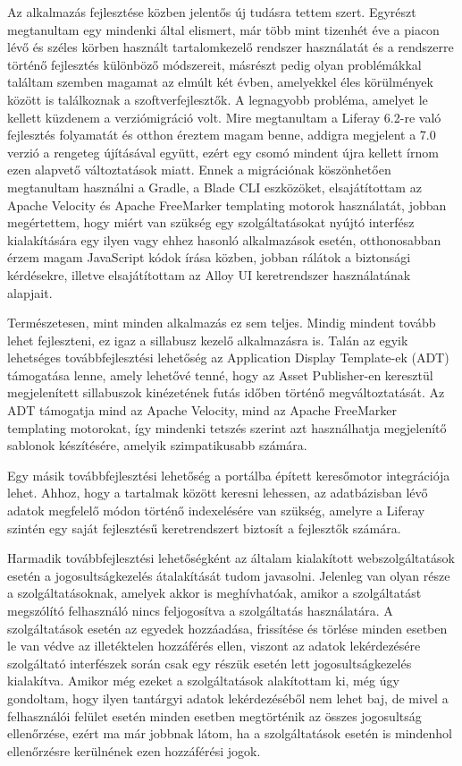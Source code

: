 \documentclass[hidelinks, 12pt, a4paper]{report}
\begin{document}
Az alkalmazás fejlesztése közben jelentős új tudásra tettem szert. Egyrészt megtanultam egy mindenki által elismert, már több mint tizenhét éve a piacon lévő és széles körben használt tartalomkezelő rendszer használatát és a rendszerre történő fejlesztés különböző módszereit, másrészt pedig olyan problémákkal találtam szemben magamat az elmúlt két évben, amelyekkel éles körülmények között is találkoznak a szoftverfejlesztők. A legnagyobb probléma, amelyet le kellett küzdenem a verziómigráció volt. Mire megtanultam a Liferay 6.2-re való fejlesztés folyamatát és otthon éreztem magam benne, addigra megjelent a 7.0 verzió a rengeteg újításával együtt, ezért egy csomó mindent újra kellett írnom ezen alapvető változtatások miatt. Ennek a migrációnak köszönhetően megtanultam használni a Gradle, a Blade CLI eszközöket, elsajátítottam az Apache Velocity és Apache FreeMarker templating motorok \cite{apache-velocity} használatát, jobban megértettem, hogy miért van szükség egy szolgáltatásokat nyújtó interfész kialakítására egy ilyen vagy ehhez hasonló alkalmazások esetén, otthonosabban érzem magam JavaScript kódok írása közben, jobban rálátok a biztonsági kérdésekre, illetve elsajátítottam az Alloy UI keretrendszer \cite{alloyui} használatának alapjait.

Természetesen, mint minden alkalmazás ez sem teljes. Mindig mindent tovább lehet fejleszteni, ez igaz a sillabusz kezelő alkalmazásra is. Talán az egyik lehetséges továbbfejlesztési lehetőség az Application Display Template-ek (ADT) támogatása lenne, amely lehetővé tenné, hogy az Asset Publisher-en keresztül megjelenített sillabuszok kinézetének futás időben történő megváltoztatását. Az ADT támogatja mind az Apache Velocity, mind az Apache FreeMarker templating \cite{apache-velocity, apache-freemarker} motorokat, így mindenki tetszés szerint azt használhatja megjelenítő sablonok készítésére, amelyik szimpatikusabb számára.

Egy másik továbbfejlesztési lehetőség a portálba épített keresőmotor integrációja lehet. Ahhoz, hogy a tartalmak között keresni lehessen, az adatbázisban lévő adatok megfelelő módon történő indexelésére van szükség, amelyre a Liferay szintén egy saját fejlesztésű keretrendszert biztosít a fejlesztők számára.

Harmadik továbbfejlesztési lehetőségként az általam kialakított webszolgáltatások esetén a jogosultságkezelés átalakítását tudom javasolni. Jelenleg van olyan része a szolgáltatásoknak, amelyek akkor is meghívhatóak, amikor a szolgáltatást megszólító felhasználó nincs feljogosítva a szolgáltatás használatára. A szolgáltatások esetén az egyedek hozzáadása, frissítése és törlése minden esetben le van védve az illetéktelen hozzáférés ellen, viszont az adatok lekérdezésére szolgáltató interfészek során csak egy részük esetén lett jogosultságkezelés kialakítva. Amikor még ezeket a szolgáltatások alakítottam ki, még úgy gondoltam, hogy ilyen tantárgyi adatok lekérdezéséből nem lehet baj, de mivel a felhasználói felület esetén minden esetben megtörténik az összes jogosultság ellenőrzése, ezért ma már jobbnak látom, ha a szolgáltatások esetén is mindenhol ellenőrzésre kerülnének ezen hozzáférési jogok.
\end{document}
